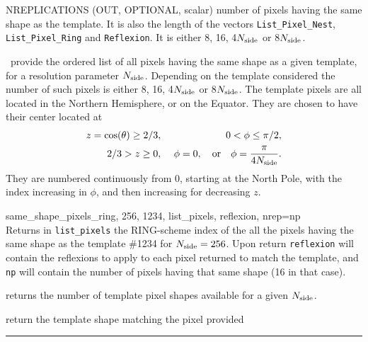 \begin{keywords}
 \begin{kwlist}{}
\item[{NREPLICATIONS}] (OUT, OPTIONAL, scalar) number of pixels having the same shape as
  the template. It is also the length of the vectors {\tt List\_Pixel\_Nest},
  {\tt List\_Pixel\_Ring} and {\tt Reflexion}. It is either 8, 16, 4${N_{\rm side}}$ or
  8${N_{\rm side}}$.
 \end{kwlist}
\end{keywords}



\begin{codedescription}
{\thedocid\ provide the ordered list of all \healpix pixels having the same shape
  as a given template, for a resolution parameter ${N_{\rm side}}$. Depending on the
  template considered the number of such pixels is either 8, 16, 4${N_{\rm side}}$ or
  8${N_{\rm side}}$. The template pixels are all located in the Northern Hemisphere, or on the
 Equator.
They are chosen to have their center located at
\begin{eqnarray}
     z=\cos(\theta)\ge 2/3,  &\ &    0< \phi \leq \pi/2,   \nonumber\\            %
     2/3 > z \geq 0,  &\ & \phi=0, \quad{\rm or}\quad  \phi=\frac{\pi}{4\nside}.  \nonumber %
\myhtmlimage{}
\end{eqnarray}
 They are numbered continuously from 0, starting at the North Pole, with the index
 increasing in $\phi$, and then increasing for decreasing $z$.
}
\end{codedescription}


\begin{example}
{
same\_shape\_pixels\_ring, 256, 1234, list\_pixels, reflexion, nrep=np  \\
}
{
Returns in {\tt list\_pixels} the RING-scheme index of the all the pixels having
the same shape as the template \#1234 for ${N_{\rm side}}=256$. Upon return {\tt reflexion} will
contain the reflexions to apply to each pixel returned to match the template,
and {\tt np} will contain the number of pixels having that same shape (16 in that case).
}
\end{example}
\begin{related}
  \begin{sulist}{} %
  \item[\htmlref{nside2templates}{idl:nside2ntemplates}] returns the
  number of template pixel shapes available for a given ${N_{\rm side}}$.
  \item[\htmlref{template\_pixel\_ring}{idl:template_pixel_xxx}] 
  \item[\htmlref{template\_pixel\_nest}{idl:template_pixel_xxx}] 
  return
  the template shape matching the pixel provided
  \end{sulist}
\end{related}

\rule{\hsize}{2mm}

